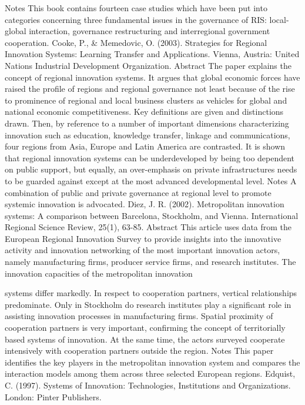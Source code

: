\documentclass[a4paper,11pt]{article}
\begin{document}
Notes
This book contains fourteen case studies which have been put into categories concerning three fundamental issues in the governance of RIS: local-global interaction, governance restructuring and interregional government cooperation.
Cooke, P., & Memedovic, O. (2003). Strategies for Regional Innovation Systems: Learning Transfer and Applications. Vienna, Austria: United Nations Industrial Development Organization.
Abstract
The paper explains the concept of regional innovation systems. It argues that global economic forces have raised the profile of regions and regional governance not least because of the rise to prominence of regional and local business clusters as vehicles for global and national economic competitiveness. Key definitions are given and distinctions drawn. Then, by reference to a number of important dimensions characterizing innovation such as education, knowledge transfer, linkage and communications, four regions from Asia, Europe and Latin America are contrasted. It is shown that regional innovation systems can be underdeveloped by being too dependent on public support, but equally, an over-emphasis on private infrastructures needs to be guarded against except at the most advanced developmental level.
Notes
A combination of public and private governance at regional level to promote systemic innovation is advocated.
Diez, J. R. (2002). Metropolitan innovation systems: A comparison between Barcelona, Stockholm, and Vienna. International Regional Science Review, 25(1), 63-85.
Abstract
This article uses data from the European Regional Innovation Survey to provide insights into the innovative activity and innovation networking of the most important innovation actors, namely manufacturing firms, producer service firms, and research institutes. The innovation capacities of the metropolitan innovation
 


systems differ markedly. In respect to cooperation partners, vertical relationships predominate. Only in Stockholm do research institutes play a significant role in assisting innovation processes in manufacturing firms. Spatial proximity of cooperation partners is very important, confirming the concept of territorially based systems of innovation. At the same time, the actors surveyed cooperate intensively with cooperation partners outside the region.
Notes
This paper identifies the key players in the metropolitan innovation system and compares the interaction models among them across three selected European regions.
Edquist, C. (1997). Systems of Innovation: Technologies, Institutions and Organizations.
London: Pinter Publishers.
\end{document}
